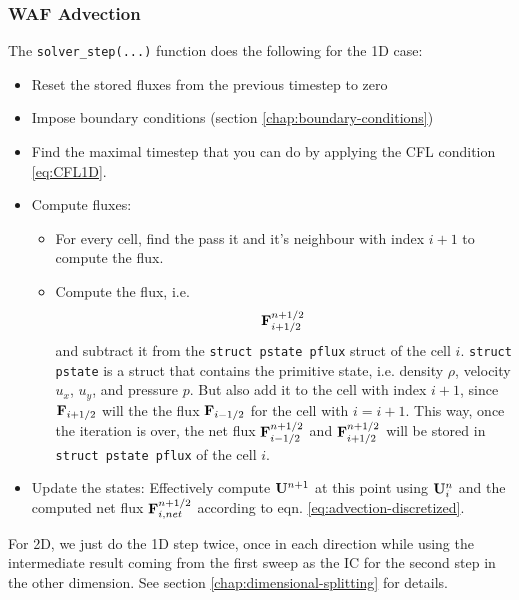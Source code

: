 \subsubsection{WAF Advection}


The \verb|solver_step(...)| function does the following for the 1D case:
\begin{itemize}
	\item 	Reset the stored fluxes from the previous timestep to zero
	\item 	Impose boundary conditions (section \ref{chap:boundary-conditions})
	\item 	Find the maximal timestep that you can do by applying the CFL condition \ref{eq:CFL1D}.
	\item 	Compute fluxes:
	\begin{itemize}
		\item 	For every cell, find the pass it and it's neighbour with index $i+1$ to compute the flux.
		\item 	Compute the flux, i.e.
				\begin{equation}
					\mathbf{F}_{i+1/2}^{n+1/2}
				\end{equation}
				and subtract it from the \texttt{struct pstate pflux} struct of the cell $i$.
				\texttt{struct pstate} is a struct that contains the primitive state, i.e. density $\rho$, velocity $u_x$, $u_y$, and pressure $p$.
				But also add it to the cell with index $i+1$, since $\mathbf{F}_{i+1/2}$ will the the flux $\mathbf{F}_{i-1/2}$ for the cell with $i = i+1$.
				This way, once the iteration is over, the net flux $\mathbf{F}_{i-1/2}^{n+1/2}$ and $\mathbf{F}_{i+1/2}^{n+1/2}$ will be stored in \texttt{struct pstate pflux} of the cell $i$.
	\end{itemize}
	\item 	Update the states: Effectively compute $\mathbf{U}^{n+1}$ at this point using $\mathbf{U}_i^n$ and the computed net flux $\mathbf{F}_{i, net}^{n+1/2}$ according to eqn. \ref{eq:advection-discretized}.
\end{itemize}


For 2D, we just do the 1D step twice, once in each direction while using the intermediate result coming from the first sweep as the IC for the second step in the other dimension.
See section \ref{chap:dimensional-splitting} for details.

